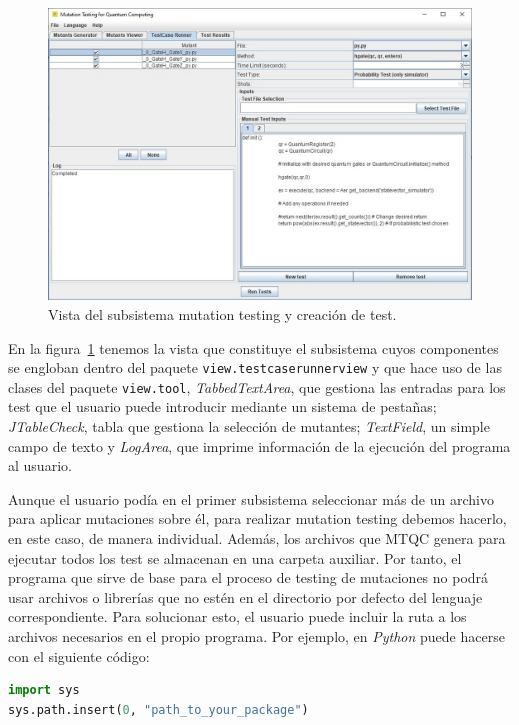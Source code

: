 \begin{figure}[t]
\begin{center}
\includegraphics[scale=0.45]{images/vista3}
\end{center}
\caption{Vista del subsistema mutation testing y creación de test.}
\label{fig:vista3}
\end{figure}

En la figura~\ref{fig:vista3} tenemos la vista que constituye el subsistema cuyos componentes se engloban dentro del paquete \texttt{view.testcaserunnerview} y que hace uso de las clases del paquete \texttt{view.tool}, \textit{TabbedTextArea}, que gestiona las entradas para los test que el usuario puede introducir mediante un sistema de pestañas; \textit{JTableCheck}, tabla que gestiona la selección de mutantes; \textit{TextField}, un simple campo de texto y \textit{LogArea}, que imprime información de la ejecución del programa al usuario.

Aunque el usuario podía en el primer subsistema seleccionar más de un archivo para aplicar mutaciones sobre él, para realizar mutation testing debemos hacerlo, en este caso, de manera individual. Además, los archivos que MTQC genera para ejecutar todos los test se almacenan en una carpeta auxiliar. Por tanto, el programa que sirve de base para el proceso de testing de mutaciones no podrá usar archivos o librerías que no estén en el directorio por defecto del lenguaje correspondiente. Para solucionar esto, el usuario puede incluir la ruta a los archivos necesarios en el propio programa. Por ejemplo, en \textit{Python} puede hacerse con el siguiente código:

\begin{lstlisting}[language=Python]
import sys
sys.path.insert(0, "path_to_your_package")
\end{lstlisting}

